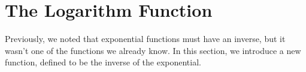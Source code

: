 \section{The Logarithm Function} 
Previously, we noted that exponential functions must have an inverse, but it wasn't one of the functions we already know. In this section, we introduce a new function, defined to be the inverse of the exponential.

 





 
 
